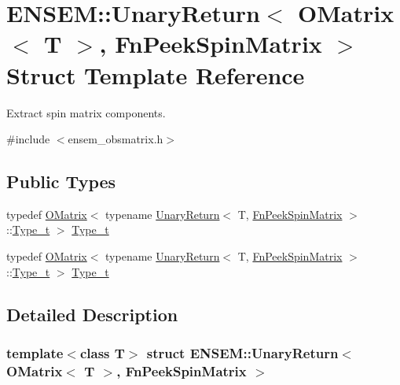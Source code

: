 \hypertarget{structENSEM_1_1UnaryReturn_3_01OMatrix_3_01T_01_4_00_01FnPeekSpinMatrix_01_4}{}\section{E\+N\+S\+EM\+:\+:Unary\+Return$<$ O\+Matrix$<$ T $>$, Fn\+Peek\+Spin\+Matrix $>$ Struct Template Reference}
\label{structENSEM_1_1UnaryReturn_3_01OMatrix_3_01T_01_4_00_01FnPeekSpinMatrix_01_4}


Extract spin matrix components.  




{\ttfamily \#include $<$ensem\+\_\+obsmatrix.\+h$>$}

\subsection*{Public Types}
\begin{DoxyCompactItemize}
\item 
typedef \mbox{\hyperlink{classENSEM_1_1OMatrix}{O\+Matrix}}$<$ typename \mbox{\hyperlink{structENSEM_1_1UnaryReturn}{Unary\+Return}}$<$ T, \mbox{\hyperlink{structENSEM_1_1FnPeekSpinMatrix}{Fn\+Peek\+Spin\+Matrix}} $>$\+::\mbox{\hyperlink{structENSEM_1_1UnaryReturn_3_01OMatrix_3_01T_01_4_00_01FnPeekSpinMatrix_01_4_a9a23ee99cd498ef33180f667eae28655}{Type\+\_\+t}} $>$ \mbox{\hyperlink{structENSEM_1_1UnaryReturn_3_01OMatrix_3_01T_01_4_00_01FnPeekSpinMatrix_01_4_a9a23ee99cd498ef33180f667eae28655}{Type\+\_\+t}}
\item 
typedef \mbox{\hyperlink{classENSEM_1_1OMatrix}{O\+Matrix}}$<$ typename \mbox{\hyperlink{structENSEM_1_1UnaryReturn}{Unary\+Return}}$<$ T, \mbox{\hyperlink{structENSEM_1_1FnPeekSpinMatrix}{Fn\+Peek\+Spin\+Matrix}} $>$\+::\mbox{\hyperlink{structENSEM_1_1UnaryReturn_3_01OMatrix_3_01T_01_4_00_01FnPeekSpinMatrix_01_4_a9a23ee99cd498ef33180f667eae28655}{Type\+\_\+t}} $>$ \mbox{\hyperlink{structENSEM_1_1UnaryReturn_3_01OMatrix_3_01T_01_4_00_01FnPeekSpinMatrix_01_4_a9a23ee99cd498ef33180f667eae28655}{Type\+\_\+t}}
\end{DoxyCompactItemize}


\subsection{Detailed Description}
\subsubsection*{template$<$class T$>$\newline
struct E\+N\+S\+E\+M\+::\+Unary\+Return$<$ O\+Matrix$<$ T $>$, Fn\+Peek\+Spin\+Matrix $>$}

